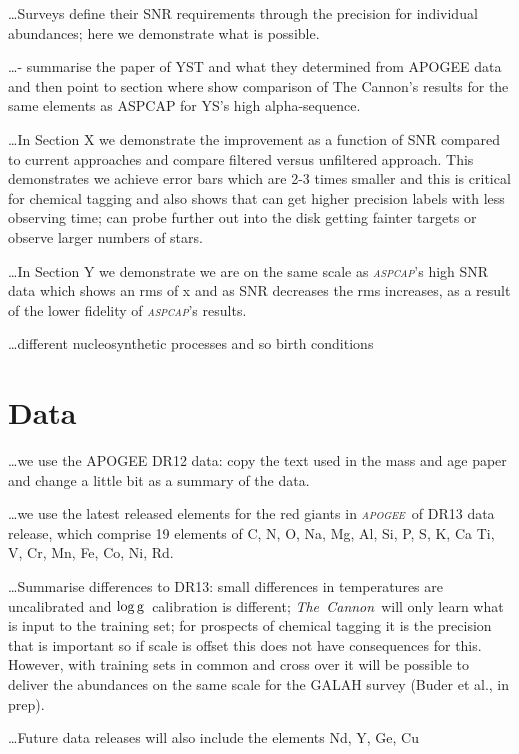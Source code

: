\documentclass[12pt, preprint]{aastex}
\newcommand{\project}[1]{\textsl{#1}}
\newcommand{\tc}{\project{The~Cannon}}
\newcommand{\apogee}{\project{\textsc{apogee}}}
\newcommand{\aspcap}{\project{\textsc{aspcap}}}
\newcommand{\logg}{\mbox{$\rm \log g$}}
\begin{document}
\ldots Surveys define their SNR requirements through the precision for individual abundances; here we demonstrate what is possible.

\ldots - summarise the paper of YST and what they determined from APOGEE data and then point to section where show comparison of The Cannon's results for the same elements as ASPCAP for YS's high alpha-sequence.


\ldots In Section X we demonstrate the improvement as a function of SNR compared to current approaches and compare filtered versus unfiltered approach. This demonstrates we achieve error bars which are 2-3 times smaller and this is critical for chemical tagging and also shows that can get higher precision labels with less observing time; can probe further out into the disk getting fainter targets or observe larger numbers of stars. 
 
 \ldots In Section Y we demonstrate we are on the same scale as \aspcap's high SNR data which shows an rms of x and as SNR decreases the rms increases, as a result of the lower fidelity of \aspcap's results. 


\ldots different nucleosynthetic processes and so birth conditions \\ 


\section{Data}

\ldots we use the APOGEE DR12 data: copy the text used in the mass and age paper and change a little bit as a summary of the data. 

\ldots we use the latest released elements for the red giants in \apogee\ of DR13 data release, which comprise 19 elements of C, N, O, Na, Mg, Al, Si, P, S, K, Ca
Ti, V, Cr, Mn, Fe, Co, Ni, Rd. 

\ldots Summarise differences to DR13: small differences in temperatures are uncalibrated and \logg\ calibration is different; \tc\ will only learn what is input to the training set; for prospects of chemical tagging it is the precision that is important so if scale is offset this does not have consequences for this. However, with training sets in common and cross over it will be possible to deliver the abundances on the same scale for the GALAH survey (Buder et al., in prep). 

\ldots Future data releases will also include the elements Nd, Y, Ge, Cu
\end{document}
